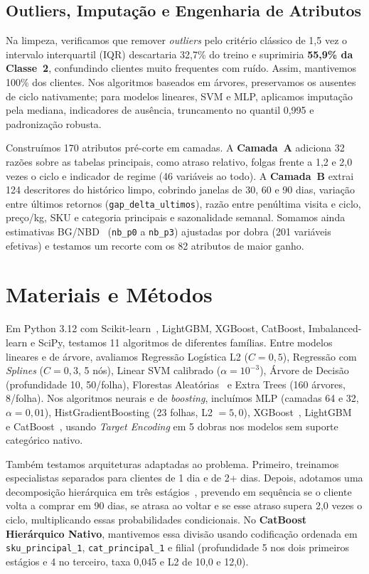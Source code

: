 \documentclass[10pt, conference, compsocconf]{IEEEtran}
\begin{document}
\subsection{Outliers, Imputação e Engenharia de Atributos}
Na limpeza, verificamos que remover \textit{outliers} pelo critério clássico de 1,5 vez o intervalo interquartil (IQR) descartaria 32,7\% do treino e suprimiria \textbf{55,9\% da Classe~2}, confundindo clientes muito frequentes com ruído. Assim, mantivemos 100\% dos clientes. Nos algoritmos baseados em árvores, preservamos os ausentes de ciclo nativamente; para modelos lineares, SVM e MLP, aplicamos imputação pela mediana, indicadores de ausência, truncamento no quantil 0,995 e padronização robusta.

Construímos 170 atributos pré-corte em camadas. A \textbf{Camada~A} adiciona 32 razões sobre as tabelas principais, como atraso relativo, folgas frente a 1,2 e 2,0 vezes o ciclo e indicador de regime (46 variáveis ao todo). A \textbf{Camada~B} extrai 124 descritores do histórico limpo, cobrindo janelas de 30, 60 e 90 dias, variação entre últimos retornos (\texttt{gap\_delta\_ultimos}), razão entre penúltima visita e ciclo, preço/kg, SKU e categoria principais e sazonalidade semanal. Somamos ainda estimativas BG/NBD~\cite{fader2005bgnbd} (\texttt{nb\_p0} a \texttt{nb\_p3}) ajustadas por dobra (201 variáveis efetivas) e testamos um recorte com os 82 atributos de maior ganho.

\section{Materiais e Métodos}
Em Python 3.12 com Scikit-learn~\cite{pedregosa2011sklearn}, LightGBM, XGBoost, CatBoost, Imbalanced-learn e SciPy, testamos 11 algoritmos de diferentes famílias. Entre modelos lineares e de árvore, avaliamos Regressão Logística L2 ($C=0{,}5$), Regressão com \textit{Splines} ($C=0{,}3$, 5 nós), Linear SVM calibrado ($\alpha=10^{-3}$), Árvore de Decisão (profundidade 10, 50/folha), Florestas Aleatórias~\cite{breiman2001rf} e Extra Trees (160 árvores, 8/folha). Nos algoritmos neurais e de \textit{boosting}, incluímos MLP (camadas 64 e 32, $\alpha=0{,}01$), HistGradientBoosting (23 folhas, L2 $=5{,}0$), XGBoost~\cite{chen2016xgboost}, LightGBM~\cite{ke2017lightgbm} e CatBoost~\cite{prokhorenkova2018catboost}, usando \textit{Target Encoding} em 5 dobras nos modelos sem suporte categórico nativo.

Também testamos arquiteturas adaptadas ao problema. Primeiro, treinamos especialistas separados para clientes de 1 dia e de 2+ dias. Depois, adotamos uma decomposição hierárquica em três estágios~\cite{silla2011hierarchical}, prevendo em sequência se o cliente volta a comprar em 90 dias, se atrasa ao voltar e se esse atraso supera 2,0 vezes o ciclo, multiplicando essas probabilidades condicionais. No \textbf{CatBoost Hierárquico Nativo}, mantivemos essa divisão usando codificação ordenada em \texttt{sku\_principal\_1}, \texttt{cat\_principal\_1} e filial (profundidade 5 nos dois primeiros estágios e 4 no terceiro, taxa 0,045 e L2 de 10,0 e 12,0).
\end{document}
